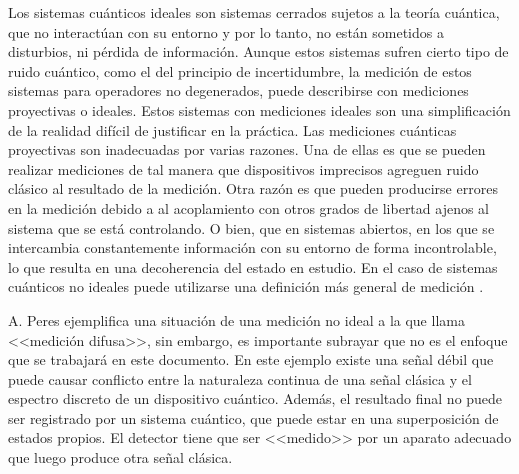 Los sistemas cuánticos ideales son sistemas cerrados sujetos a la teoría cuántica, que no interactúan con su entorno y por lo tanto, no están sometidos a disturbios, ni pérdida de información. Aunque estos sistemas sufren cierto tipo de ruido cuántico, como el del principio de incertidumbre, la medición de estos sistemas para operadores no degenerados, puede describirse con mediciones proyectivas o ideales. Estos sistemas con mediciones ideales son una simplificación de la realidad difícil de justificar en la práctica. Las mediciones cuánticas proyectivas son inadecuadas por varias razones. Una de ellas es que se pueden realizar mediciones de tal manera que dispositivos imprecisos agreguen ruido clásico al resultado de la medición. Otra razón es que pueden producirse errores en la medición debido a al acoplamiento con otros grados de libertad ajenos al sistema que se está controlando. O bien, que en sistemas abiertos, en los que se intercambia constantemente información con su entorno de forma incontrolable, lo que resulta en una decoherencia del estado en estudio. En el caso de sistemas cuánticos no ideales puede utilizarse una definición más general de medición {\cite{wilde2011classical, jaeger2007quantum}}.




A. Peres {\cite{peres1997quantum}} ejemplifica una situación de una medición no ideal a la que llama <<medición difusa>>, sin embargo, es importante subrayar que no es el enfoque que se trabajará en este documento. En este ejemplo existe una señal débil que puede causar conflicto entre la naturaleza continua de una señal clásica y el espectro discreto de un dispositivo cuántico. Además, el resultado final no puede ser registrado por un sistema cuántico, que puede estar en una superposición de estados propios. El detector tiene que ser <<medido>> por un aparato adecuado que luego produce otra señal clásica.


